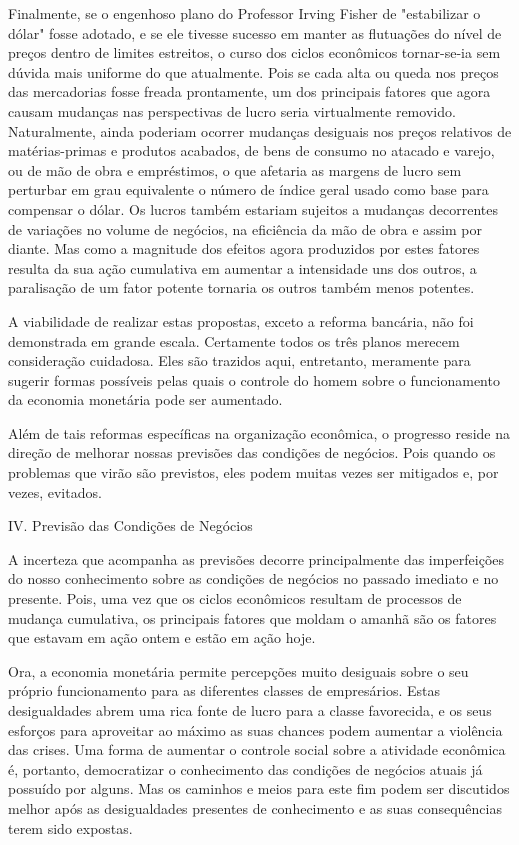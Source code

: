 \documentclass[12pt]{article}
\begin{document}
Finalmente, se o engenhoso plano do Professor Irving Fisher de "estabilizar o dólar" fosse adotado, e se ele tivesse sucesso em manter as flutuações do nível de preços dentro de limites estreitos, o curso dos ciclos econômicos tornar-se-ia sem dúvida mais uniforme do que atualmente. Pois se cada alta ou queda nos preços das mercadorias fosse freada prontamente, um dos principais fatores que agora causam mudanças nas perspectivas de lucro seria virtualmente removido. Naturalmente, ainda poderiam ocorrer mudanças desiguais nos preços relativos de matérias-primas e produtos acabados, de bens de consumo no atacado e varejo, ou de mão de obra e empréstimos, o que afetaria as margens de lucro sem perturbar em grau equivalente o número de índice geral usado como base para compensar o dólar. Os lucros também estariam sujeitos a mudanças decorrentes de variações no volume de negócios, na eficiência da mão de obra e assim por diante. Mas como a magnitude dos efeitos agora produzidos por estes fatores resulta da sua ação cumulativa em aumentar a intensidade uns dos outros, a paralisação de um fator potente tornaria os outros também menos potentes.

A viabilidade de realizar estas propostas, exceto a reforma bancária, não foi demonstrada em grande escala. Certamente todos os três planos merecem consideração cuidadosa. Eles são trazidos aqui, entretanto, meramente para sugerir formas possíveis pelas quais o controle do homem sobre o funcionamento da economia monetária pode ser aumentado.

Além de tais reformas específicas na organização econômica, o progresso reside na direção de melhorar nossas previsões das condições de negócios. Pois quando os problemas que virão são previstos, eles podem muitas vezes ser mitigados e, por vezes, evitados.

IV. Previsão das Condições de Negócios

A incerteza que acompanha as previsões decorre principalmente das imperfeições do nosso conhecimento sobre as condições de negócios no passado imediato e no presente. Pois, uma vez que os ciclos econômicos resultam de processos de mudança cumulativa, os principais fatores que moldam o amanhã são os fatores que estavam em ação ontem e estão em ação hoje.

Ora, a economia monetária permite percepções muito desiguais sobre o seu próprio funcionamento para as diferentes classes de empresários. Estas desigualdades abrem uma rica fonte de lucro para a classe favorecida, e os seus esforços para aproveitar ao máximo as suas chances podem aumentar a violência das crises. Uma forma de aumentar o controle social sobre a atividade econômica é, portanto, democratizar o conhecimento das condições de negócios atuais já possuído por alguns. Mas os caminhos e meios para este fim podem ser discutidos melhor após as desigualdades presentes de conhecimento e as suas consequências terem sido expostas.
\end{document}

